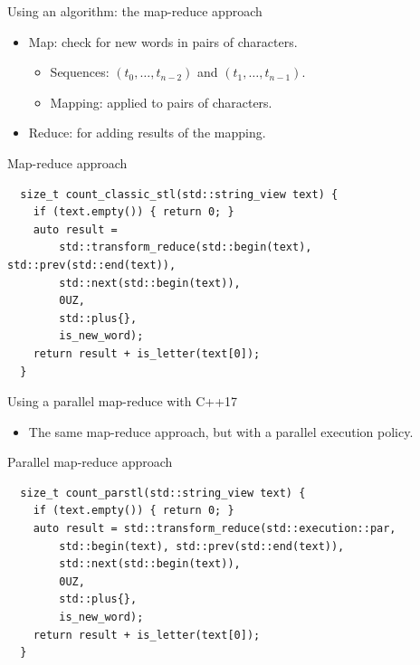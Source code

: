 \begin{frame}[t,fragile]{Using an algorithm: the map-reduce approach}
    \begin{itemize}
        \item Map: check for new words in pairs of characters.
          \begin{itemize}
              \item Sequences: $(t_0, \ldots, t_{n-2})$ and $(t_1, \ldots, t_{n-1})$.
              \item Mapping:  applied to pairs of characters.
          \end{itemize}
        \item Reduce:  for adding results of the mapping.
    \end{itemize}

\begin{block}{Map-reduce approach}
\begin{lstlisting}
  size_t count_classic_stl(std::string_view text) {
    if (text.empty()) { return 0; }
    auto result =
        std::transform_reduce(std::begin(text), std::prev(std::end(text)), 
        std::next(std::begin(text)), 
        0UZ,
        std::plus{}, 
        is_new_word);
    return result + is_letter(text[0]);
  }
\end{lstlisting}
\end{block}
\end{frame}

\begin{frame}[t,fragile]{Using a parallel map-reduce with C++17}
    \begin{itemize}
        \item The same map-reduce approach, but with a parallel execution policy.
    \end{itemize}

\begin{block}{Parallel map-reduce approach}
\begin{lstlisting}
  size_t count_parstl(std::string_view text) {
    if (text.empty()) { return 0; }
    auto result = std::transform_reduce(std::execution::par, 
        std::begin(text), std::prev(std::end(text)),
        std::next(std::begin(text)), 
        0UZ, 
        std::plus{},
        is_new_word);
    return result + is_letter(text[0]);
  }
\end{lstlisting}
\end{block}
\end{frame}

